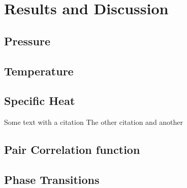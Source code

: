 \documentclass[
10pt, %
a4paper, %
oneside, %
headinclude,footinclude, %
BCOR5mm, %
]{scrartcl}
\begin{document}
\section{Results and Discussion}

\subsection{Pressure}

\subsection{Temperature}



\subsection{Specific Heat}




Some text with a citation \cite{Verlet:1967md}
The other citation \cite{Glosser:2015iccp} and another\cite{Thijssen:2013cp}


\subsection{Pair Correlation function}

\subsection{Phase Transitions}





\newpage

\renewcommand{\refname}{\spacedlowsmallcaps{References}} %






\end{document}
